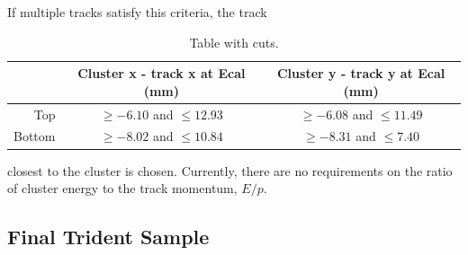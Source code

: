 If multiple tracks satisfy this criteria, the track 
\begin{table}[h]
    \begin{center}
        \begin{tabular}{r|cc}
            \hline
                    & Cluster x - track x at Ecal (mm) &  Cluster y - track y at Ecal (mm)  \\
            \hline
            Top     & $\ge -6.10$ and $\le 12.93$ & $\ge -6.08$ and $\le 11.49$ \\ 
            Bottom  & $\ge -8.02$ and $\le 10.84$ & $\ge -8.31$ and $\le 7.40$  \\ 
            \hline
        \end{tabular}
    \end{center}
    \caption{Table with cuts.}
    \label{tab:track_cluster_cuts}
\end{table}
closest to the cluster is chosen.  Currently, there are no requirements on the
ratio of cluster energy to the track momentum, $E/p$.
   
\subsection{Final Trident Sample}

